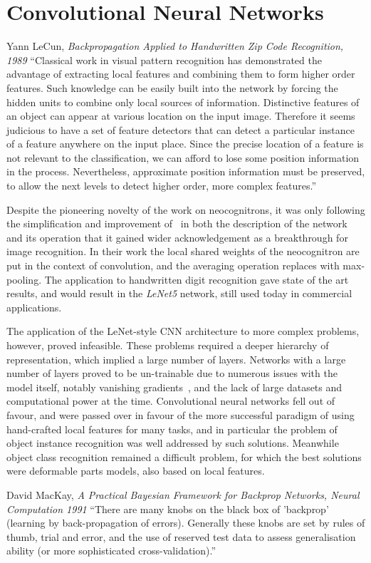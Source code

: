 \documentclass[thesis]{subfiles}
\begin{document}
	\section{Convolutional Neural Networks}
	\begin{chapquote}{Yann LeCun, \textit{Backpropagation Applied to Handwritten Zip Code Recognition, 1989}}
		``Classical work in visual pattern recognition has demonstrated the advantage of extracting local features and combining them to form higher order features. Such knowledge can be easily built into the network by forcing the hidden units to combine only local sources of information. Distinctive features of an object can appear at various location on the input image. Therefore it seems judicious to have a set of feature detectors that can detect a particular instance of a feature anywhere on the input place. Since the precise location of a feature is not relevant to the classification, we can afford to lose some position information in the process. Nevertheless, approximate position information must be preserved, to allow the next levels to detect higher order, more complex features.''
	\end{chapquote}
	
	Despite the pioneering novelty of the work on neocognitrons, it was only following the simplification and improvement of~\citet{Lecun1998} in both the description of the network and its operation that it gained wider acknowledgement as a breakthrough for image recognition. In their work the local shared weights of the neocognitron are put in the context of convolution, and the averaging operation replaces with max-pooling. The application to handwritten digit recognition gave state of the art results, and would result in the \emph{LeNet5} network, still used today in commercial applications.
	
	The application of the LeNet-style CNN architecture to more complex problems, however, proved infeasible. These problems required a deeper hierarchy of representation, which implied a large number of layers. Networks with a large number of layers proved to be un-trainable due to numerous issues with the model itself, notably vanishing gradients~\citep{hochreiter1991untersuchungen}, and the lack of large datasets and computational power at the time. Convolutional neural networks fell out of favour, and were passed over in favour of the more successful paradigm of using hand-crafted local features for many tasks, and in particular the problem of object instance recognition was well addressed by such solutions. Meanwhile object class recognition remained a difficult problem, for which the best solutions were deformable parts models, also based on local features.
	
	
	\begin{chapquote}{David MacKay, \textit{A Practical Bayesian Framework for Backprop Networks, Neural Computation 1991}}
		``There are many knobs on the black box of 'backprop' (learning by back-propagation of
		errors). Generally these knobs are set by rules of thumb, trial and error, and the use of reserved test data to assess generalisation ability (or more sophisticated cross-validation).''
	\end{chapquote}
	
\end{document}

